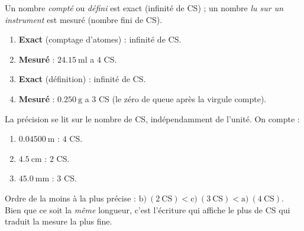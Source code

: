\documentclass[11pt,a4paper]{article}
\begin{document}
\begin{corrige}
Un nombre \emph{compté} ou \emph{défini} est exact (infinité de CS) ; un nombre \emph{lu sur un
instrument} est mesuré (nombre fini de CS).
\begin{enumerate}[label=\alph*)]
  \item \textbf{Exact} (comptage d'atomes) : infinité de CS.
  \item \textbf{Mesuré} : $\qty{24,15}{\milli\litre}$ a $4$ CS.
  \item \textbf{Exact} (définition) : infinité de CS.
  \item \textbf{Mesuré} : $\qty{0,250}{\gram}$ a $3$ CS (le zéro de queue après la virgule compte).
\end{enumerate}
\end{corrige}

\begin{corrige}
La précision se lit sur le nombre de CS, indépendamment de l'unité. On compte :
\begin{enumerate}[label=\alph*)]
  \item $\qty{0,04500}{\metre}$ : $4$ CS.
  \item $\qty{4,5}{\centi\metre}$ : $2$ CS.
  \item $\qty{45,0}{\milli\metre}$ : $3$ CS.
\end{enumerate}
Ordre de la moins à la plus précise : $\text{b)}\ (2\ \text{CS}) < \text{c)}\ (3\ \text{CS}) <
\text{a)}\ (4\ \text{CS})$. Bien que ce soit la \emph{même} longueur, c'est l'écriture qui affiche
le plus de CS qui traduit la mesure la plus fine.
\end{corrige}
\end{document}
